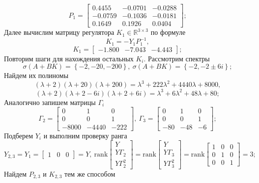 \documentclass[a4paper, 12pt]{article}
\begin{document}
    $$
    P_1=\begin{bmatrix}
    0.4455   &-0.0701   &-0.0288\\
   -0.0759   &-0.1036   &-0.0181\\
    0.1649    &0.1926    &0.0404
    \end{bmatrix};
    $$
    Далее вычислим матрицу регулятора $K_1\in\mathbb{R}^{3\times3}$ по формуле
    $$K_1=-Y_1P_1^{-1},$$
    $$K_1=\begin{bmatrix}
        -1.800   &-7.043   &-4.443
    \end{bmatrix};$$
    Повторим шаги для нахождения остальных $K_i$. Рассмотрим спектры $$\sigma\left(A+BK\right)=\left\{-2,-20,-200\right\},\ \sigma\left(A+BK\right)=\left\{-2,-2\pm6i\right\};$$
    Найдем их полиномы
    $$\left(\lambda+2\right)\left(\lambda+20\right)\left(\lambda+200\right)=\lambda^3+222\lambda^2+4440\lambda+8000,$$
    $$\left(\lambda+2\right)\left(\lambda+2-6i\right)\left(\lambda+2+6i\right)=\lambda^3+6\lambda^2+48\lambda+80;$$
    Аналогично запишем матрицы $\Gamma_i$
    $$\Gamma_2=\begin{bmatrix}
        0 &1 &0\\
        0 &0 &1\\
        -8000 &-4440 &-222
    \end{bmatrix},\ \Gamma_3=\begin{bmatrix}
        0 &1 &0\\
        0 &0 &1\\
        -80 &-48 &-6
    \end{bmatrix};$$
    Подберем $Y_i$ и выполним проверку ранга
    $$
    Y_{2,3}=Y_1=\begin{bmatrix}
        1 &0 &0
    \end{bmatrix}=Y,\
    \text{rank}\begin{bmatrix}
        Y\\
        Y\Gamma_2\\
        Y\Gamma_2^2
    \end{bmatrix}=\text{rank}\begin{bmatrix}
        Y\\
        Y\Gamma_3\\
        Y\Gamma_3^2
    \end{bmatrix}=\text{rank}\begin{bmatrix}
        1 &0 &0\\
        0 &1 &0\\
        0 &0 &1
    \end{bmatrix}=3;
    $$
    Найдем $P_{2,3}$ и $K_{2,3}$ тем же способом
\end{document}
